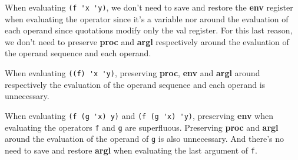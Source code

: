 \documentclass[a4paper,12pt]{article}
\begin{document}
When evaluating \lstinline!(f 'x 'y)!, we don't need to save and
restore the \textbf{env} register when evaluating the operator since
it's a variable nor around the evaluation of each operand since
quotations modify only the val register.  For this last reason, we
don't need to preserve \textbf{proc} and \textbf{argl} respectively
around the evaluation of the operand sequence and each operand.

When evaluating \lstinline!((f) 'x 'y)!, preserving \textbf{proc},
\textbf{env} and \textbf{argl} around respectively the evaluation of
the operand sequence and each operand is unnecessary.

When evaluating \lstinline!(f (g 'x) y)! and
\lstinline!(f (g 'x) 'y)!, preserving \textbf{env} when evaluating the operators
\lstinline!f! and \lstinline!g! are superfluous.  Preserving
\textbf{proc} and \textbf{argl} around the evaluation of the
operand of \lstinline!g! is also unnecessary.  And there's no need to
save and restore \textbf{argl} when evaluating the last argument of
\lstinline!f!.
\end{document}
